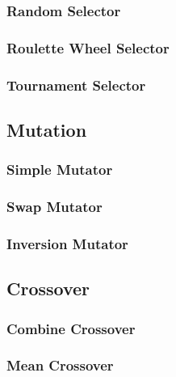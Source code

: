       \subsubsection{Random Selector}
      \label{sec:keen:operators:selection:random}
        \Blindtext
      \subsubsection{Roulette Wheel Selector}
      \label{sec:keen:operators:selection:roulette_wheel}
        \Blindtext
      \subsubsection{Tournament Selector}
      \label{sec:keen:operators:selection:tournament}
        \Blindtext
    \subsection{Mutation}
    \label{sec:keen:operators:mutation}
      \subsubsection{Simple Mutator}
      \label{sec:keen:operators:mutation:simple}
        \Blindtext
      \subsubsection{Swap Mutator}
      \label{sec:keen:operators:mutation:swap}
        \Blindtext
      \subsubsection{Inversion Mutator}
      \label{sec:keen:operators:mutation:inversion}
        \Blindtext
    \subsection{Crossover}
    \label{sec:keen:operators:crossover}
      \subsubsection{Combine Crossover}
      \label{sec:keen:operators:crossover:combine}
        \Blindtext
      \subsubsection{Mean Crossover}
      \label{sec:keen:operators:crossover:mean}
        \Blindtext
